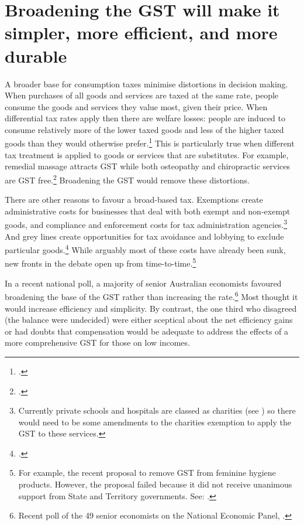 \documentclass{grattanAlpha}
\begin{document}
\section{Broadening the GST will make it simpler, more efficient, and more durable}\label{sec:GST-2-3}
A broader base for consumption taxes minimise distortions in decision making. When purchases of all goods and services are taxed at the same rate, people consume the goods and services they value most, given their price. When differential tax rates apply then there are welfare losses: people are induced to consume relatively more of the lower taxed goods and less of the higher taxed goods than they would otherwise prefer.\footcite{AtkinsonStiglitz1976}  This is particularly true when different tax treatment is applied to goods or services that are substitutes. For example, remedial massage attracts GST while both osteopathy and chiropractic services are GST free.\footcite[][\S38-7]{GST-Act-1999}  Broadening the GST would remove these distortions.  

There are other reasons to favour a broad-based tax. Exemptions create administrative costs for businesses that deal with both exempt and non-exempt goods, and compliance and enforcement costs for tax administration agencies.\footnote{Currently private schools and hospitals are classed as charities (see \textcite{ACNC2015}) so there would need to be some amendments to the charities exemption to apply the GST to these services.}  And grey lines create opportunities for tax avoidance and lobbying to exclude particular goods.\footcite{Freebairn2015}  While arguably most of these costs have already been sunk, new fronts in the debate open up from time-to-time.\footnote{For example, the recent proposal to remove GST from feminine hygiene products. However, the proposal failed because it did not receive unanimous support from State and Territory governments. See: \textcite{Hockey2015-Federal-Finance-Relations}.}  

In a recent national poll, a majority of senior Australian economists favoured broadening the base of the GST rather than increasing the rate.\footnote{Recent poll of the 49 senior economists on the National Economic Panel, \textcite{NationalEconomicSocietyAustralia2015-GST}.}  Most thought it would increase efficiency and simplicity. By contrast, the one third who disagreed (the balance were undecided) were either sceptical about the net efficiency gains or had doubts that compensation would be adequate to address the effects of a more comprehensive GST for those on low incomes.
\end{document}
